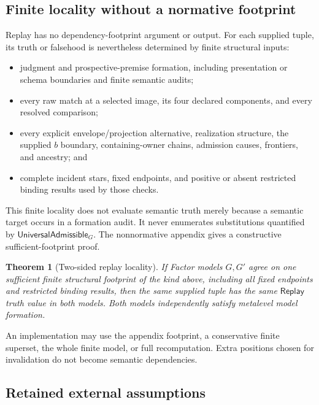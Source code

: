 \documentclass[11pt,twoside]{article}
\newcommand{\Replay}{\mathsf{Replay}}
\newcommand{\UniversalAdmissible}{\mathsf{UniversalAdmissible}}
\newtheorem{theorem}{Theorem}
\begin{document}
\subsection{Finite locality without a normative footprint}

Replay has no dependency-footprint argument or output.  For each supplied tuple,
its truth or falsehood is nevertheless determined by finite structural inputs:

\begin{itemize}[leftmargin=2em]
  \item judgment and prospective-premise formation, including presentation or
        schema boundaries and finite semantic audits;
  \item every raw match at a selected image, its four declared components, and
        every resolved comparison;
  \item every explicit envelope/projection alternative, realization structure,
        the supplied \(b\) boundary,
        containing-owner chains, admission causes, frontiers, and ancestry; and
  \item complete incident stars, fixed endpoints, and positive or absent restricted
        binding results used by those checks.
\end{itemize}

This finite locality does not evaluate semantic truth merely because a semantic
target occurs in a formation audit.  It never enumerates substitutions quantified
by \(\UniversalAdmissible_G\).  The nonnormative appendix gives a constructive
sufficient-footprint proof.

\begin{theorem}[Two-sided replay locality]\label{thm:replay-locality}
If Factor models \(G,G'\) agree on one sufficient finite structural footprint of
the kind above, including all fixed endpoints and restricted binding results, then
the same supplied tuple has the same \(\Replay\) truth value in both models.  Both
models independently satisfy metalevel model formation.
\end{theorem}

An implementation may use the appendix footprint, a conservative finite superset,
the whole finite model, or full recomputation.  Extra positions chosen for
invalidation do not become semantic dependencies.

\subsection{Retained external assumptions}
\end{document}
